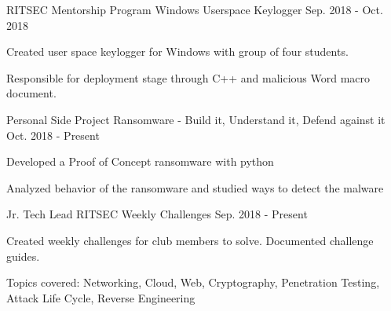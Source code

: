 

\begin{cventries}

  \cventry
    {RITSEC Mentorship Program} %
    {Windows Userspace Keylogger} %
    {} %
    {Sep. 2018 - Oct. 2018} %
    {
      \begin{cvitems} %
        \item {Created user space keylogger for Windows with group of four students.}
        \item {Responsible for deployment stage through C++ and malicious Word macro document.}
      \end{cvitems}
    }
    
    \cventry
    {Personal Side Project} %
    {Ransomware - Build it, Understand it, Defend against it} %
    {} %
    {Oct. 2018 - Present} %
    {
      \begin{cvitems} %
        \item {Developed a Proof of Concept ransomware with python}
        \item {Analyzed behavior of the ransomware and studied ways to detect the malware}
      \end{cvitems}
    }

  \cventry
    {Jr. Tech Lead} %
    {RITSEC Weekly Challenges} %
    {} %
    {Sep. 2018 - Present} %
    {
      \begin{cvitems} %
        \item {Created weekly challenges for club members to solve. Documented challenge guides.}
        \item {Topics covered: Networking, Cloud, Web, Cryptography, Penetration Testing, Attack Life Cycle, Reverse Engineering}
      \end{cvitems}
    }
    

\end{cventries}